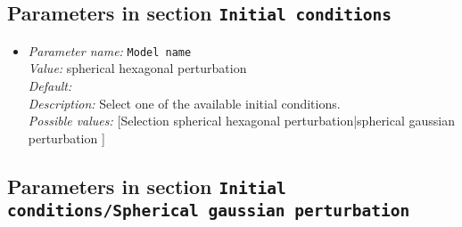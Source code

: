 \subsection{Parameters in section \tt Initial conditions}

\begin{itemize}
\item {\it Parameter name:} {\tt Model name}\\
{\it Value:} spherical hexagonal perturbation\\
{\it Default:} \\
{\it Description:} Select one of the available initial conditions.\\
{\it Possible values:} [Selection spherical hexagonal perturbation|spherical gaussian perturbation ]
\end{itemize}



\subsection{Parameters in section \tt Initial conditions/Spherical gaussian perturbation}

